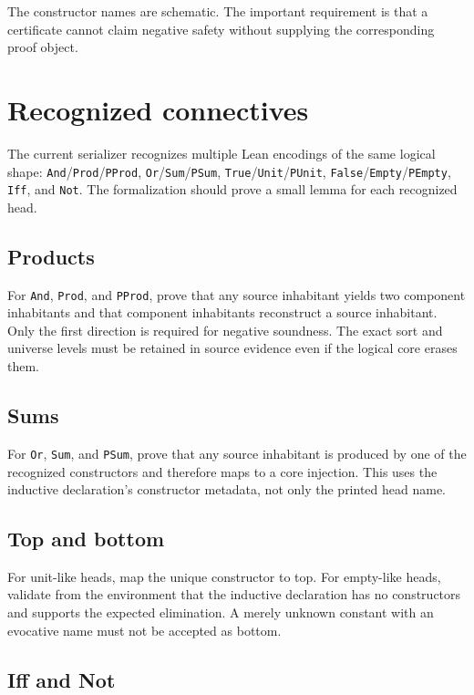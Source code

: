 \documentclass[11pt,letterpaper,openany]{report}
\theoremstyle{definition}
\theoremstyle{remark}
\newcommand{\code}[1]{\texttt{#1}}
\begin{document}
The constructor names are schematic. The important requirement is that a certificate cannot claim negative safety without supplying the corresponding proof object.

\section{Recognized connectives}

The current serializer recognizes multiple Lean encodings of the same logical shape: \code{And}/\code{Prod}/\code{PProd}, \code{Or}/\code{Sum}/\code{PSum}, \code{True}/\code{Unit}/\code{PUnit}, \code{False}/\code{Empty}/\code{PEmpty}, \code{Iff}, and \code{Not}. The formalization should prove a small lemma for each recognized head.

\subsection{Products}

For \code{And}, \code{Prod}, and \code{PProd}, prove that any source inhabitant yields two component inhabitants and that component inhabitants reconstruct a source inhabitant. Only the first direction is required for negative soundness. The exact sort and universe levels must be retained in source evidence even if the logical core erases them.

\subsection{Sums}

For \code{Or}, \code{Sum}, and \code{PSum}, prove that any source inhabitant is produced by one of the recognized constructors and therefore maps to a core injection. This uses the inductive declaration's constructor metadata, not only the printed head name.

\subsection{Top and bottom}

For unit-like heads, map the unique constructor to top. For empty-like heads, validate from the environment that the inductive declaration has no constructors and supports the expected elimination. A merely unknown constant with an evocative name must not be accepted as bottom.

\subsection{Iff and Not}
\end{document}
